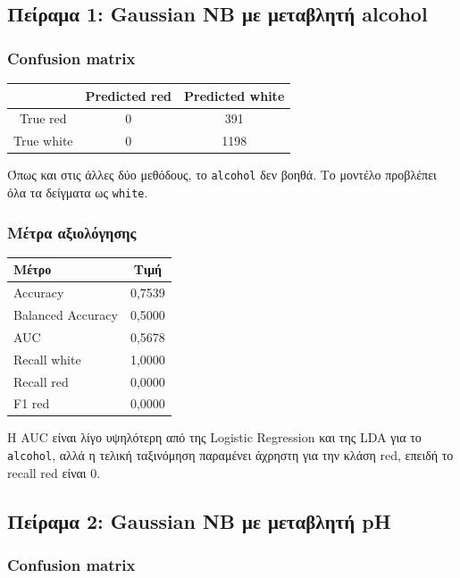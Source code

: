 \documentclass[11pt,a4paper]{article}
\newcommand{\code}[1]{\texttt{#1}}
\begin{document}
\subsection{Πείραμα 1: Gaussian NB με μεταβλητή alcohol}

\subsubsection{Confusion matrix}

\begin{center}
\begin{tabular}{c|cc}
\toprule
 & Predicted red & Predicted white \\
\midrule
True red & 0 & 391 \\
True white & 0 & 1198 \\
\bottomrule
\end{tabular}
\end{center}

Όπως και στις άλλες δύο μεθόδους, το \code{alcohol} δεν βοηθά. Το μοντέλο
προβλέπει όλα τα δείγματα ως \code{white}.

\subsubsection{Μέτρα αξιολόγησης}

\begin{center}
\begin{tabular}{lc}
\toprule
Μέτρο & Τιμή \\
\midrule
Accuracy & 0,7539 \\
Balanced Accuracy & 0,5000 \\
AUC & 0,5678 \\
Recall white & 1,0000 \\
Recall red & 0,0000 \\
F1 red & 0,0000 \\
\bottomrule
\end{tabular}
\end{center}

Η AUC είναι λίγο υψηλότερη από της Logistic Regression και της LDA για το
\code{alcohol}, αλλά η τελική ταξινόμηση παραμένει άχρηστη για την κλάση red,
επειδή το recall red είναι 0.

\subsection{Πείραμα 2: Gaussian NB με μεταβλητή pH}

\subsubsection{Confusion matrix}
\end{document}
